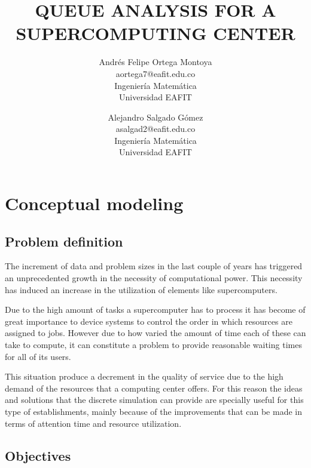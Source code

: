\documentclass{wscpaperproc}
\begin{document}

\title{QUEUE ANALYSIS FOR A SUPERCOMPUTING CENTER}

\author{Andrés Felipe Ortega Montoya\\ [12pt]
aortega7@eafit.edu.co\\
Ingeniería Matemática\\
Universidad EAFIT\\
\and
Alejandro Salgado Gómez\\[12pt]
asalgad2@eafit.edu.co\\
Ingeniería Matemática\\
Universidad EAFIT\\
}

\maketitle

\section{Conceptual modeling}

\subsection{Problem definition}

The increment of data and problem sizes in the last couple of years has
triggered an unprecedented growth in the necessity of computational
power. This necessity has induced an increase in the utilization of
elements like supercomputers.

Due to the high amount of tasks a supercomputer has to process
it has become of great importance to device systems to control the
order in which resources are assigned to jobs. However due to how
varied the amount of time each of these can take to compute, it can
constitute a problem to provide reasonable waiting times for all of its
users.

This situation produce a decrement in the quality of service
due to the high demand of the resources that a computing center offers.
For this reason the ideas and solutions that the discrete simulation can provide
are specially useful for this type of establishments, mainly because of
the improvements that can be made in terms of attention time and resource
utilization.

\subsection{Objectives}
\end{document}
